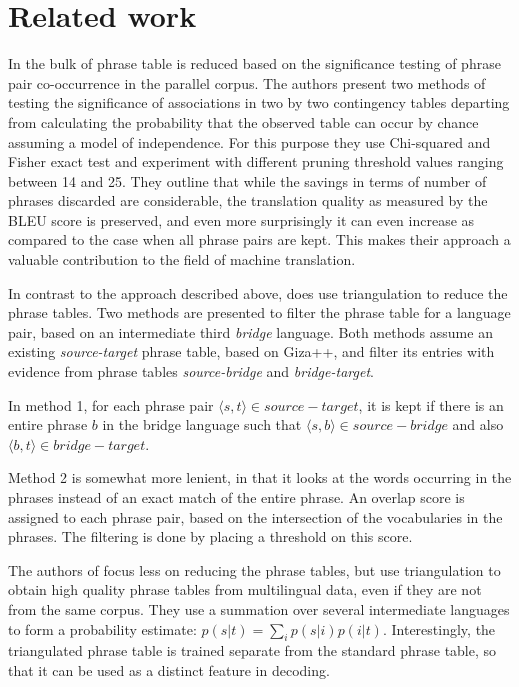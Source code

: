 \documentclass[11pt]{article}
\begin{document}
\section{Related work}

In \cite{Johnson} the bulk of phrase table is reduced based on the significance testing of phrase pair co-occurrence in the parallel corpus. The authors present two methods of testing the significance of associations in two by two contingency tables departing from calculating the probability that the observed table can occur by chance assuming a model of independence. For this purpose they use Chi-squared and Fisher exact test and experiment with different pruning threshold values ranging between 14 and 25. They outline that while the savings in terms of number of phrases discarded are considerable, the translation quality as measured by the BLEU score is preserved, and even more surprisingly it can even increase as compared to the case when all phrase pairs are kept. This makes their approach a valuable contribution to the field of machine translation.


In contrast to the approach described above, \cite{chen} does use triangulation to reduce the phrase tables.
Two methods are presented to filter the phrase table for a language pair, based on an intermediate third \emph{bridge} language. Both methods assume an existing {\em source-target} phrase table, based on Giza++, and filter its entries with evidence from phrase tables {\em source-bridge} and {\em bridge-target}.

In method 1, for each phrase pair $\langle s, t\rangle \in source-target$, it is kept if there is an entire phrase $b$ in the bridge language such that $\langle s,b\rangle \in source-bridge$ and also $\langle b,t\rangle \in bridge-target$.

Method 2 is somewhat more lenient, in that it looks at the words occurring in the phrases instead of an exact match of the entire phrase. An overlap score is assigned to each phrase pair, based on the intersection of the vocabularies in the phrases. The filtering is done by placing a threshold on this score.

The authors of \cite{cohn} focus less on reducing the phrase tables, but use triangulation to obtain high quality phrase tables from multilingual data, even if they are not from the same corpus. They use a summation over several intermediate languages to form a probability estimate: $p(s|t)=\sum_i p(s|i)p(i|t)$. Interestingly, the triangulated phrase table is trained separate from the standard phrase table, so that it can be used as a distinct feature in decoding.
\end{document}
